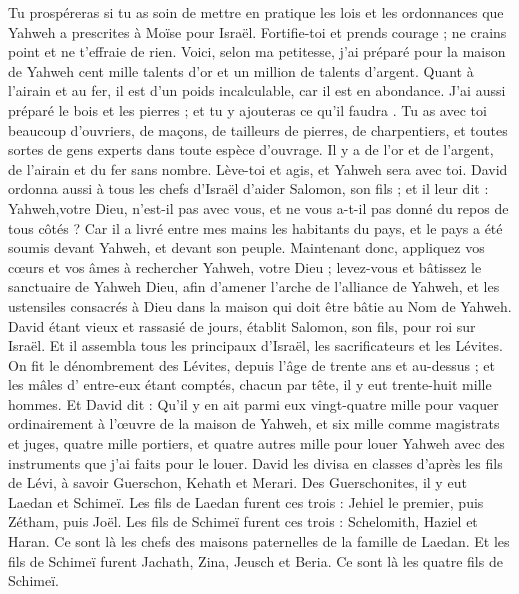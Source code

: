 \begin{multicols}{2}
Tu prospéreras si tu as soin de mettre en pratique les lois et les ordonnances que Yahweh a prescrites à Moïse pour Israël. Fortifie-toi et prends courage ; ne crains point et ne t'effraie de rien.
Voici, selon ma petitesse, j'ai préparé pour la maison de Yahweh cent mille talents d'or et un million de talents d'argent. Quant à l'airain et au fer, il est d'un poids incalculable, car il est en abondance. J'ai aussi préparé le bois et les pierres ; et tu y ajouteras ce qu'il faudra .
Tu as avec toi beaucoup d'ouvriers, de maçons, de tailleurs de pierres, de charpentiers, et toutes sortes de gens experts dans toute espèce d’ouvrage.
Il y a de l'or et de l'argent, de l'airain et du fer sans nombre. Lève-toi et agis, et Yahweh sera avec toi.
David ordonna aussi à tous les chefs d'Israël d'aider Salomon, son fils ; et il leur dit :
Yahweh,votre Dieu, n'est-il pas avec vous, et ne vous a-t-il pas donné du repos de tous côtés ? Car il a livré entre mes mains les habitants du pays, et le pays a été soumis devant Yahweh, et devant son peuple.
Maintenant donc, appliquez vos cœurs et vos âmes à rechercher Yahweh, votre Dieu ; levez-vous et bâtissez le sanctuaire de Yahweh Dieu, afin d’amener l’arche de l'alliance de Yahweh, et les ustensiles consacrés à Dieu dans la maison qui doit être bâtie au Nom de Yahweh.
\VerseOne{}David étant vieux et rassasié de jours, établit Salomon, son fils, pour roi sur Israël.
Et il assembla tous les principaux d'Israël, les sacrificateurs et les Lévites.
On fit le dénombrement des Lévites, depuis l'âge de trente ans et au-dessus ; et les mâles d' entre-eux étant comptés, chacun par tête, il y eut trente-huit mille hommes.
Et David dit : Qu’il y en ait  parmi eux vingt-quatre mille pour vaquer ordinairement à l'œuvre de la maison de Yahweh, et six mille comme  magistrats et juges,
quatre mille portiers, et quatre autres mille pour louer Yahweh avec des instruments que j'ai faits pour le louer.
David les divisa en classes d'après les fils de Lévi, à savoir Guerschon, Kehath et Merari.
Des Guerschonites, il y eut Laedan et Schimeï.
Les fils de Laedan furent ces trois : Jehiel le premier, puis Zétham, puis Joël.
Les fils de Schimeï furent ces trois : Schelomith, Haziel et Haran. Ce sont là les chefs des maisons paternelles de la famille de Laedan.
Et les fils de Schimeï furent Jachath, Zina, Jeusch et Beria. Ce sont là les quatre fils de Schimeï.

\end{multicols}
